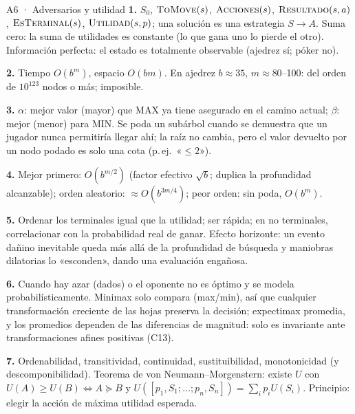 \begin{solucion}{A6 · Adversarios y utilidad}
\textbf{1.} $S_0$, $\textsc{ToMove}(s)$, $\textsc{Acciones}(s)$, $\textsc{Resultado}(s,a)$,
$\textsc{EsTerminal}(s)$, $\textsc{Utilidad}(s,p)$; una solución es una estrategia $S\to A$. Suma cero:
la suma de utilidades es constante (lo que gana uno lo pierde el otro). Información perfecta: el
estado es totalmente observable (ajedrez sí; póker no).

\textbf{2.} Tiempo $O(b^m)$, espacio $O(bm)$. En ajedrez $b\approx35$, $m\approx 80$–100: del orden de
$10^{123}$ nodos o más; imposible.

\textbf{3.} $\alpha$: mejor valor (mayor) que MAX ya tiene asegurado en el camino actual; $\beta$: mejor
(menor) para MIN. Se poda un subárbol cuando se demuestra que un jugador nunca permitiría llegar ahí;
la raíz no cambia, pero el valor devuelto por un nodo podado es solo una cota (p.\,ej.\ «$\le 2$»).

\textbf{4.} Mejor primero: $O(b^{m/2})$ (factor efectivo $\sqrt b$; duplica la profundidad alcanzable);
orden aleatorio: $\approx O(b^{3m/4})$; peor orden: sin poda, $O(b^m)$.

\textbf{5.} Ordenar los terminales igual que la utilidad; ser rápida; en no terminales, correlacionar
con la probabilidad real de ganar. Efecto horizonte: un evento dañino inevitable queda más allá de la
profundidad de búsqueda y maniobras dilatorias lo «esconden», dando una evaluación engañosa.

\textbf{6.} Cuando hay azar (dados) o el oponente no es óptimo y se modela probabilísticamente.
Minimax solo compara (max/min), así que cualquier transformación creciente de las hojas preserva la
decisión; expectimax promedia, y los promedios dependen de las diferencias de magnitud: solo es
invariante ante transformaciones afines positivas (C13).

\textbf{7.} Ordenabilidad, transitividad, continuidad, sustituibilidad, monotonicidad (y
descomponibilidad). Teorema de von Neumann–Morgenstern: existe $U$ con $U(A)\ge U(B)\iff A\succeq B$
y $U([p_1,S_1;\dots;p_n,S_n])=\sum_i p_iU(S_i)$. Principio: elegir la acción de máxima utilidad esperada.
\end{solucion}

